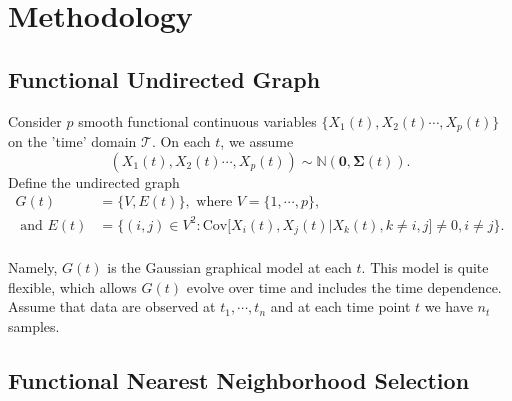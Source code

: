 \documentclass[11pt]{article}
\newcommand{\N}{\mathbb N}
\newcommand{\bSigma}{{\boldsymbol{\Sigma}}}
\begin{document}
\section{Methodology}

\subsection{Functional Undirected Graph}
Consider $p$ smooth functional continuous variables $\{ X_1(t), X_2(t) \cdots, X_p(t)\}$ on the 'time' domain $\mathcal{T}$. On each $t$, we assume
$$ (X_1(t), X_2(t) \cdots, X_p(t)) \sim \N(\mathbf{0}, \bSigma(t)). $$ 
Define the undirected graph 
\begin{equation}
	\label{eq:funcgraph}
	\begin{aligned}
	G(t) &= \Big\{ V, E(t) \Big\},\text{ where } V = \Big\{1,\cdots, p\Big\},\\
	\text{ and } E(t) &= \Big\{ (i,j) \in V^2 : \text{Cov} \Big[ X_i(t), X_j(t)| X_k(t), k \neq i,j \Big] \neq 0, i \neq j \Big\}.\\
	\end{aligned}
\end{equation}

Namely, $G(t)$ is the Gaussian graphical model at each $t$. This model is quite flexible, which allows $G(t)$ evolve over time and includes the time dependence. Assume that data are observed at $t_1, \cdots, t_n$ and at each time point $t$ we have $n_{t}$ samples.

\subsection{Functional Nearest Neighborhood Selection}
\end{document}

